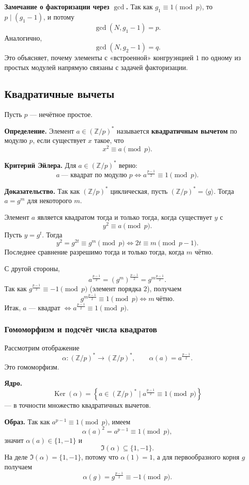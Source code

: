 \documentclass[12pt,a4paper]{article}
\newcommand{\Z}{\mathbb{Z}}
\DeclareMathOperator{\gcdop}{gcd}
\DeclareMathOperator{\Ker}{Ker}
\begin{document}
\textbf{Замечание о факторизации через $\gcd$.}
Так как $g_1\equiv 1\pmod p$, то $p\mid (g_1-1)$, и потому
\[
\gcdop(N,g_1-1)=p.
\]
Аналогично,
\[
\gcdop(N,g_2-1)=q.
\]
Это объясняет, почему элементы с «встроенной» конгруэнцией $1$ по одному из простых модулей напрямую связаны с задачей факторизации.

\subsection*{Квадратичные вычеты}

Пусть $p$ — нечётное простое.

\textbf{Определение.}
Элемент $a\in(\Z/p)^{\ast}$ называется \textbf{квадратичным вычетом} по модулю $p$, если существует $x$ такое, что
\[
x^2\equiv a\pmod p.
\]

\textbf{Критерий Эйлера.}
Для $a\in(\Z/p)^{\ast}$ верно:
\[
a\ \text{— квадрат по модулю }p
\iff
a^{\frac{p-1}{2}}\equiv 1\pmod p.
\]

\textbf{Доказательство.}
Так как $(\Z/p)^{\ast}$ циклическая, пусть $(\Z/p)^{\ast}=\langle g\rangle$.
Тогда $a=g^{m}$ для некоторого $m$.

Элемент $a$ является квадратом тогда и только тогда, когда существует $y$ с
\[
y^2\equiv a\pmod p.
\]
Пусть $y=g^{t}$. Тогда
\[
y^2=g^{2t}\equiv g^m \pmod p \iff 2t\equiv m\pmod{p-1}.
\]
Последнее сравнение разрешимо тогда и только тогда, когда $m$ чётно.

С другой стороны,
\[
a^{\frac{p-1}{2}}=(g^m)^{\frac{p-1}{2}}=g^{m\frac{p-1}{2}}.
\]
Так как $g^{\frac{p-1}{2}}\equiv -1\pmod p$ (элемент порядка $2$), получаем
\[
g^{m\frac{p-1}{2}}\equiv 1\pmod p \iff m\ \text{чётно}.
\]
Итак, $a$ — квадрат $\iff a^{\frac{p-1}{2}}\equiv 1\pmod p$.

\subsubsection*{Гомоморфизм и подсчёт числа квадратов}

Рассмотрим отображение
\[
\alpha:(\Z/p)^{\ast}\to(\Z/p)^{\ast},\qquad \alpha(a)=a^{\frac{p-1}{2}}.
\]
Это гомоморфизм.

\textbf{Ядро.}
\[
\Ker(\alpha)=\left\{a\in(\Z/p)^{\ast}\mid a^{\frac{p-1}{2}}\equiv 1\pmod p\right\}
\]
— в точности множество квадратичных вычетов.

\textbf{Образ.}
Так как $a^{p-1}\equiv 1\pmod p$, имеем
\[
\alpha(a)^2=a^{p-1}\equiv 1\pmod p,
\]
значит $\alpha(a)\in\{1,-1\}$ и
\[
\Im(\alpha)\subseteq\{1,-1\}.
\]
На деле $\Im(\alpha)=\{1,-1\}$, потому что $\alpha(1)=1$, а для первообразного корня $g$ получаем
\[
\alpha(g)=g^{\frac{p-1}{2}}\equiv -1\pmod p.
\]
\end{document}
